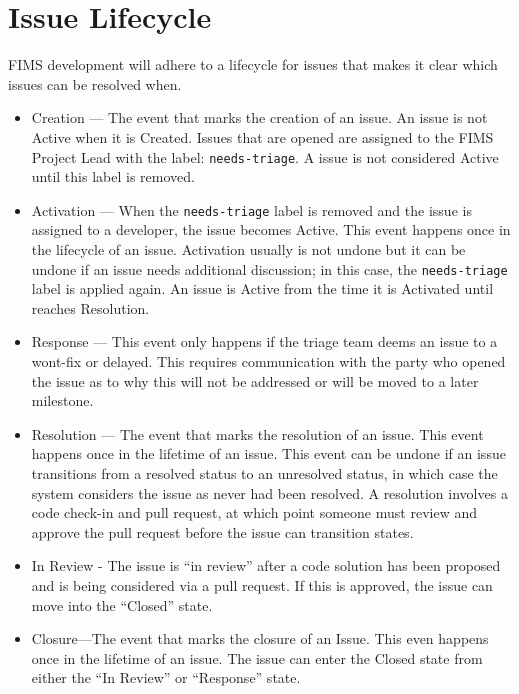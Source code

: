 \documentclass[
]{book}
\providecommand{\tightlist}{%
  \setlength{\itemsep}{0pt}\setlength{\parskip}{0pt}}
\begin{document}
\hypertarget{issue-lifecycle}{%
\section{Issue Lifecycle}\label{issue-lifecycle}}

FIMS development will adhere to a lifecycle for issues that makes it clear which issues can be resolved when.

\begin{itemize}
\tightlist
\item
  Creation --- The event that marks the creation of an issue. An issue is not Active when it is Created. Issues that are opened are assigned to the FIMS Project Lead with the label: \texttt{needs-triage}. A issue is not considered Active until this label is removed.
\item
  Activation --- When the \texttt{needs-triage} label is removed and the issue is assigned to a developer, the issue becomes Active. This event happens once in the lifecycle of an issue. Activation usually is not undone but it can be undone if an issue needs additional discussion; in this case, the \texttt{needs-triage} label is applied again. An issue is Active from the time it is Activated until reaches Resolution.
\item
  Response --- This event only happens if the triage team deems an issue to a wont-fix or delayed. This requires communication with the party who opened the issue as to why this will not be addressed or will be moved to a later milestone.
\item
  Resolution --- The event that marks the resolution of an issue. This event happens once in the lifetime of an issue. This event can be undone if an issue transitions from a resolved status to an unresolved status, in which case the system considers the issue as never had been resolved. A resolution involves a code check-in and pull request, at which point someone must review and approve the pull request before the issue can transition states.
\item
  In Review - The issue is ``in review'' after a code solution has been proposed and is being considered via a pull request. If this is approved, the issue can move into the ``Closed'' state.
\item
  Closure---The event that marks the closure of an Issue. This even happens once in the lifetime of an issue. The issue can enter the Closed state from either the ``In Review'' or ``Response'' state.
\end{itemize}
\end{document}
